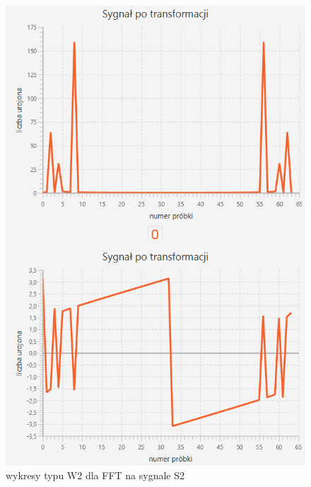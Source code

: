 \documentclass[12pt]{article}
\begin{document}
\begin{figure}[H]
	\centering
	\includegraphics[width=\linewidth]{S2_FFT_W2.png}
	\caption{wykresy typu W2 dla FFT na sygnale S2}
	\label{S2_FFT_W2}
\end{figure}
\end{document}
